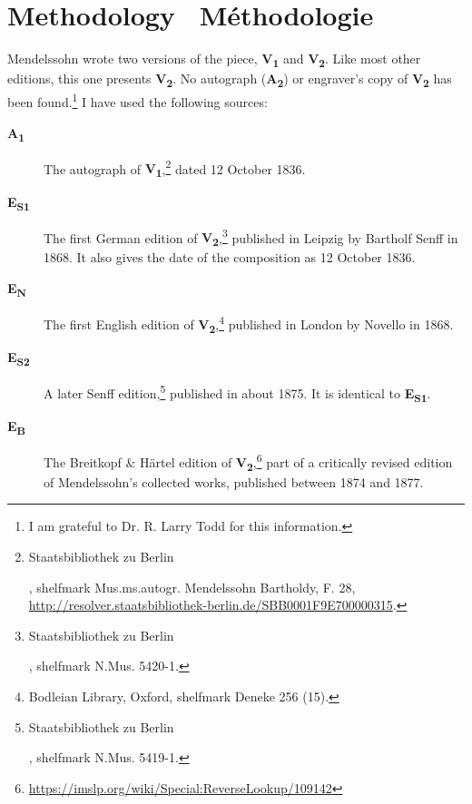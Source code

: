 \documentclass[a4paper, 12pt]{book}
\newcommand{\source}[2]{\textbf{#1\textsubscript{#2}}}
\newcommand{\bigdot}[0]{{\Large \textbullet}}
\begin{document}
\ifdef{\critical}
  {%
    \section*{Methodology \bigdot\ Méthodologie}

    Mendelssohn wrote two versions of the piece, \source{V}{1} and
    \source{V}{2}. Like most other editions, this one presents
    \source{V}{2}. No autograph (\source{A}{2}) or engraver's copy of
    \source{V}{2} has been found.\footnote{I am grateful to
      Dr. R. Larry Todd for this information.} I have used the
    following sources:
    
    \begin{description}
    \item[\source{A}{1}] The autograph of
      \source{V}{1},\footnote{\begin{otherlanguage}{ngerman}Staatsbibliothek
          zu Berlin\end{otherlanguage}, shelfmark
          Mus.ms.autogr. Mendelssohn Bartholdy, F. 28,
          \url{http://resolver.staatsbibliothek-berlin.de/SBB0001F9E700000315}.}
      dated 12 October 1836.
    \item[\source{E}{S1}] The first German edition of
      \source{V}{2},\footnote{\begin{otherlanguage}{ngerman}Staatsbibliothek
          zu Berlin\end{otherlanguage}, shelfmark N.Mus. 5420-1.}
      published in Leipzig by Bartholf Senff in 1868. It also gives
      the date of the composition as 12 October 1836.
    \item[\source{E}{N}] The first English edition of
      \source{V}{2},\footnote{Bodleian Library, Oxford, shelfmark
        Deneke 256 (15).} published in London by Novello in 1868.
    \item[\source{E}{S2}] A later Senff
      edition,\footnote{\begin{otherlanguage}{ngerman}Staatsbibliothek
          zu Berlin\end{otherlanguage}, shelfmark N.Mus. 5419-1.}
      published in about 1875. It is identical to \source{E}{S1}.
    \item[\source{E}{B}] The Breitkopf \& Härtel edition of
      \source{V}{2},\footnote{\url{https://imslp.org/wiki/Special:ReverseLookup/109142}\label{imslp}}
      part of a critically revised edition of Mendelssohn's collected
      works, published between 1874 and 1877.
    \end{description}

}
\end{document}
